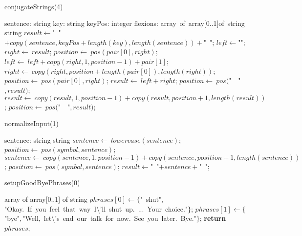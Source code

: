 \documentclass[a4paper,10pt]{article}
\begin{document}
\begin{algorithm}
\caption{conjugateStrings(4)}
\begin{algorithmic}[5]
    \State sentence: string
    \State key: string
    \State keyPos: integer
    \State flexions: array\ of\ array[0..1]of\ string
  \EndDecl
    \State string
  \EndDecl
  \State \(result\gets\)"{}\ "{}\(+copy(sentence,keyPos+length(key),length(sentence))+\)"{}\ "{}\(\);
    \State \(left\gets\)"{}"{}\(\);
    \State \(right\gets\ result\);
    \State \(position\gets\ pos(pair[0],right)\);
      \State \(left\gets\ left+copy(right,1,position-1)+pair[1]\);
      \State \(right\gets\ copy(right,position+length(pair[0]),length(right))\);
      \State \(position\gets\ pos(pair[0],right)\);
    \EndWhile
    \State \(result\gets\ left+right\);
  \EndFor
  \State \(position\gets\ pos(\)"{}\ \ "{}\(,result)\);
    \State \(result\gets\ copy(result,1,position-1)+copy(result,position+1,length(result))\);
    \State \(position\gets\ pos(\)"{}\ \ "{}\(,result)\);
  \EndWhile
\EndFunction
\end{algorithmic}
\end{algorithm}


\begin{algorithm}
\caption{normalizeInput(1)}
\begin{algorithmic}[5]
\State {}
\State {}
\State {}
    \State sentence: string
  \EndDecl
    \State string
  \EndDecl
  \State \(sentence\gets\ lowercase(sentence)\);
    \State \(position\gets\ pos(symbol,sentence)\);
      \State \(sentence\gets\ copy(sentence,1,position-1)+copy(sentence,position+1,length(sentence))\);
      \State \(position\gets\ pos(symbol,sentence)\);
    \EndWhile
  \EndFor
  \State \(result\gets\)"{}\ "{}\(+sentence+\)"{}\ "{}\(\);
\EndFunction
\end{algorithmic}
\end{algorithm}


\begin{algorithm}
\caption{setupGoodByePhrases(0)}
\begin{algorithmic}[5]
    \State array of array[0..1] of string
  \EndDecl
  \State \(phrases[0]\gets\{\)"{}\ shut"{}\(,\)"{}Okay.\ If\ you\ feel\ that\ way\ I\textbackslash{}'{}ll\ shut\ up.\ ...\ Your\ choice."{}\(\}\);
  \State \(phrases[1]\gets\{\)"{}bye"{}\(,\)"{}Well,\ let\textbackslash{}'{}s\ end\ our\ talk\ for\ now.\ See\ you\ later.\ Bye."{}\(\}\);
  \State \textbf{return} \(phrases\);
\EndFunction
\end{algorithmic}
\end{algorithm}
\end{document}
